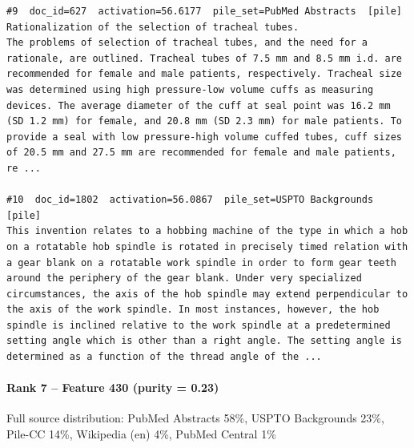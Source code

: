 \begin{verbatim}
#9  doc_id=627  activation=56.6177  pile_set=PubMed Abstracts  [pile]
Rationalization of the selection of tracheal tubes.
The problems of selection of tracheal tubes, and the need for a rationale, are outlined. Tracheal tubes of 7.5 mm and 8.5 mm i.d. are recommended for female and male patients, respectively. Tracheal size was determined using high pressure-low volume cuffs as measuring devices. The average diameter of the cuff at seal point was 16.2 mm (SD 1.2 mm) for female, and 20.8 mm (SD 2.3 mm) for male patients. To provide a seal with low pressure-high volume cuffed tubes, cuff sizes of 20.5 mm and 27.5 mm are recommended for female and male patients, re ...

#10  doc_id=1802  activation=56.0867  pile_set=USPTO Backgrounds  [pile]
This invention relates to a hobbing machine of the type in which a hob on a rotatable hob spindle is rotated in precisely timed relation with a gear blank on a rotatable work spindle in order to form gear teeth around the periphery of the gear blank. Under very specialized circumstances, the axis of the hob spindle may extend perpendicular to the axis of the work spindle. In most instances, however, the hob spindle is inclined relative to the work spindle at a predetermined setting angle which is other than a right angle. The setting angle is determined as a function of the thread angle of the ...

\end{verbatim}

\paragraph*{Rank 7 -- Feature 430 (purity = 0.23)}

Full source distribution: PubMed Abstracts 58\%, USPTO Backgrounds 23\%, Pile-CC 14\%, Wikipedia (en) 4\%, PubMed Central 1\%

